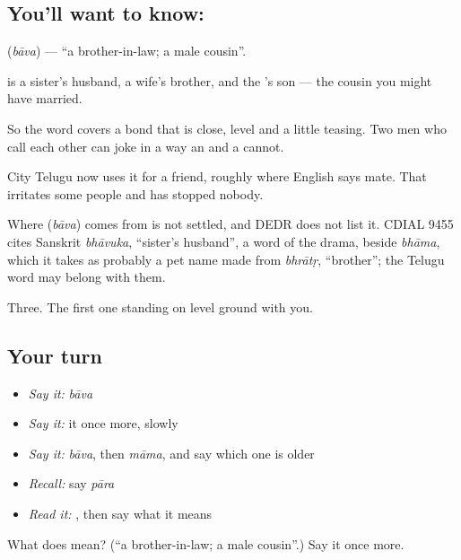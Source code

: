 \subsection*{You'll want to know: }
\textbf{} (\emph{bāva}) — \textquotedblleft{}a brother-in-law; a male cousin\textquotedblright{}.

 is a sister's husband, a wife's brother, and the 's son — the cousin you might have married.

So the word covers a bond that is close, level and a little teasing. Two men who call each other  can joke in a way an  and a  cannot.

City Telugu now uses it for a friend, roughly where English says mate. That irritates some people and has stopped nobody.

\begin{cousinweb}
Where \textbf{} (\emph{bāva}) comes from is not settled, and DEDR does not list it. CDIAL 9455 cites Sanskrit \emph{bhāvuka}, \textquotedblleft{}sister's husband\textquotedblright{}, a word of the drama, beside \emph{bhāma}, which it takes as probably a pet name made from \emph{bhrātṛ}, \textquotedblleft{}brother\textquotedblright{}; the Telugu word may belong with them.
\end{cousinweb}

\begin{grammarlens}[title={What you've built}]
Three. The first one standing on level ground with you.
\end{grammarlens}

\subsection*{Your turn}
\begin{itemize}
\raggedright
  \item \emph{Say it:} \emph{bāva}
  \item \emph{Say it:} it once more, slowly
  \item \emph{Say it:} \emph{bāva}, then \emph{māma}, and say which one is older
  \item \emph{Recall:} say \emph{pāra}
  \item \emph{Read it:} \textbf{}, then say what it means
\end{itemize}

\begin{tcolorbox}[breakable,colback=teal!4,colframe=teal!35!black,title={Before you move on}]
What does  mean? (\textquotedblleft{}a brother-in-law; a male cousin\textquotedblright{}.) Say it once more.
\end{tcolorbox}
